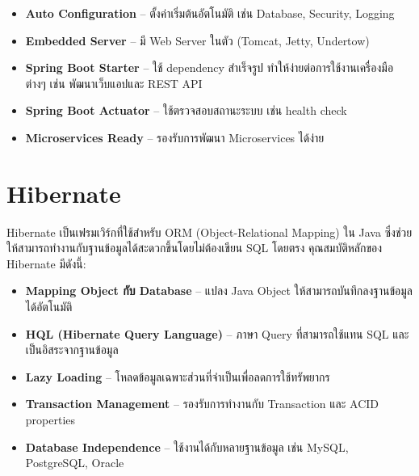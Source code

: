 \begin{itemize}
\item \textbf{Auto Configuration} – ตั้งค่าเริ่มต้นอัตโนมัติ เช่น Database, Security, Logging
\item \textbf{Embedded Server} – มี Web Server ในตัว (Tomcat, Jetty, Undertow)
\item \textbf{Spring Boot Starter} – ใช้ dependency สำเร็จรูป ทำให้ง่ายต่อการใช้งานเครื่องมือต่างๆ เช่น พัฒนาเว็บแอปและ REST API
\item \textbf{Spring Boot Actuator} – ใช้ตรวจสอบสถานะระบบ เช่น health check
\item \textbf{Microservices Ready} – รองรับการพัฒนา Microservices ได้ง่าย
\end{itemize}

\section{Hibernate}
\hspace{1.27cm}Hibernate เป็นเฟรมเวิร์กที่ใช้สำหรับ ORM (Object-Relational Mapping) ใน Java ซึ่งช่วยให้สามารถทำงานกับฐานข้อมูลได้สะดวกขึ้นโดยไม่ต้องเขียน SQL โดยตรง คุณสมบัติหลักของ Hibernate มีดังนี้:

\begin{itemize}
\item \textbf{Mapping Object กับ Database} – แปลง Java Object ให้สามารถบันทึกลงฐานข้อมูลได้อัตโนมัติ
\item \textbf{HQL (Hibernate Query Language)} – ภาษา Query ที่สามารถใช้แทน SQL และเป็นอิสระจากฐานข้อมูล
\item \textbf{Lazy Loading} – โหลดข้อมูลเฉพาะส่วนที่จำเป็นเพื่อลดการใช้ทรัพยากร
\item \textbf{Transaction Management} – รองรับการทำงานกับ Transaction และ ACID properties
\item \textbf{Database Independence} – ใช้งานได้กับหลายฐานข้อมูล เช่น MySQL, PostgreSQL, Oracle
\end{itemize}




